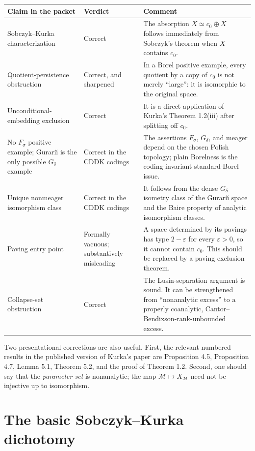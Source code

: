 \documentclass[11pt]{article}
\theoremstyle{definition}
\newcommand{\czer}{c_0}
\newcommand{\iso}{\simeq}
\begin{document}
\renewcommand{\arraystretch}{1.18}
\begin{tabularx}{\textwidth}{>{\raggedright\arraybackslash}p{}
                              >{\raggedright\arraybackslash}p{}
                              X}
\toprule
Claim in the packet & Verdict & Comment \\
\midrule
Sobczyk--Kurka characterization & Correct & The absorption
\(X\iso\czer\oplus X\) follows immediately from Sobczyk's theorem when
\(X\) contains \(\czer\). \\
Quotient-persistence obstruction & Correct, and sharpened & In a Borel
positive example, every quotient by a copy of \(\czer\) is not merely
``large'': it is isomorphic to the original space. \\
Unconditional-embedding exclusion & Correct & It is a direct application of
Kurka's Theorem 1.2(iii) after splitting off \(\czer\). \\
No \(F_\sigma\) positive example; Gurari\u\i{} is the only possible
\(G_\delta\) example & Correct in the CDDK codings & The assertions
\(F_\sigma\), \(G_\delta\), and meager depend on the chosen Polish topology;
plain Borelness is the coding-invariant standard-Borel issue. \\
Unique nonmeager isomorphism class & Correct in the CDDK codings & It follows
from the dense \(G_\delta\) isometry class of the Gurari\u\i{} space and the
Baire property of analytic isomorphism classes. \\
Paving entry point & Formally vacuous; substantively misleading & A space
determined by its pavings has type \(2-\varepsilon\) for every
\(\varepsilon>0\), so it cannot contain \(\czer\).  This should be replaced by
a paving exclusion theorem. \\
Collapse-set obstruction & Correct & The Lusin-separation argument is sound.
It can be strengthened from ``nonanalytic excess'' to a properly coanalytic,
Cantor--Bendixson-rank-unbounded excess. \\
\bottomrule
\end{tabularx}

Two presentational corrections are also useful.  First, the relevant numbered
results in the published version of Kurka's paper are Proposition 4.5,
Proposition 4.7, Lemma 5.1, Theorem 5.2, and the proof of Theorem 1.2.
Second, one should say that the \emph{parameter set} is nonanalytic; the map
\(\mathcal M\mapsto X_{\mathcal M}\) need not be injective up to isomorphism.

\section{The basic Sobczyk--Kurka dichotomy}
\end{document}
